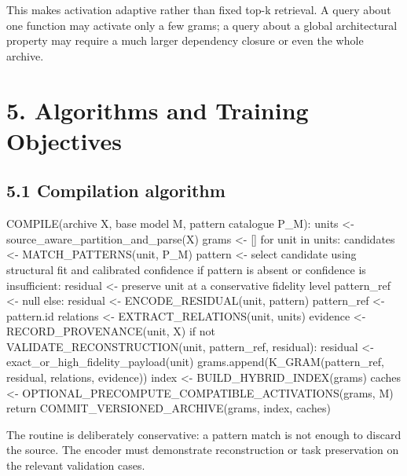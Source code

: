 \documentclass[
  10pt,
]{article}
\newenvironment{Shaded}{}{}
\newcommand{\NormalTok}[1]{#1}
\begin{document}
This makes activation adaptive rather than fixed top-k retrieval. A
query about one function may activate only a few grams; a query about a
global architectural property may require a much larger dependency
closure or even the whole archive.

\section{5. Algorithms and Training
Objectives}\label{algorithms-and-training-objectives}

\subsection{5.1 Compilation algorithm}\label{compilation-algorithm}

\begin{Shaded}
\begin{Highlighting}[]
\NormalTok{COMPILE(archive X, base model M, pattern catalogue P\_M):}
\NormalTok{    units \textless{}{-} source\_aware\_partition\_and\_parse(X)}
\NormalTok{    grams \textless{}{-} []}
\NormalTok{    for unit in units:}
\NormalTok{        candidates \textless{}{-} MATCH\_PATTERNS(unit, P\_M)}
\NormalTok{        pattern \textless{}{-} select candidate using structural fit and calibrated confidence}
\NormalTok{        if pattern is absent or confidence is insufficient:}
\NormalTok{            residual \textless{}{-} preserve unit at a conservative fidelity level}
\NormalTok{            pattern\_ref \textless{}{-} null}
\NormalTok{        else:}
\NormalTok{            residual \textless{}{-} ENCODE\_RESIDUAL(unit, pattern)}
\NormalTok{            pattern\_ref \textless{}{-} pattern.id}
\NormalTok{        relations \textless{}{-} EXTRACT\_RELATIONS(unit, units)}
\NormalTok{        evidence \textless{}{-} RECORD\_PROVENANCE(unit, X)}
\NormalTok{        if not VALIDATE\_RECONSTRUCTION(unit, pattern\_ref, residual):}
\NormalTok{            residual \textless{}{-} exact\_or\_high\_fidelity\_payload(unit)}
\NormalTok{        grams.append(K\_GRAM(pattern\_ref, residual, relations, evidence))}
\NormalTok{    index \textless{}{-} BUILD\_HYBRID\_INDEX(grams)}
\NormalTok{    caches \textless{}{-} OPTIONAL\_PRECOMPUTE\_COMPATIBLE\_ACTIVATIONS(grams, M)}
\NormalTok{    return COMMIT\_VERSIONED\_ARCHIVE(grams, index, caches)}
\end{Highlighting}
\end{Shaded}

The routine is deliberately conservative: a pattern match is not enough
to discard the source. The encoder must demonstrate reconstruction or
task preservation on the relevant validation cases.
\end{document}
